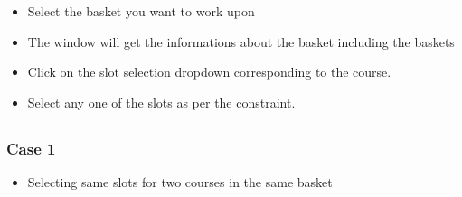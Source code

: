 \documentclass[letterpaper,10pt,english]{sphinxmanual}
\begin{document}
\begin{itemize}
\item {} 
Select the basket you want to work upon

\end{itemize}

\begin{itemize}
\item {} 
The window will get the informations about the basket including the baskets

\end{itemize}

\begin{itemize}
\item {} 
Click on the slot selection dropdown corresponding to the course.

\end{itemize}

\begin{itemize}
\item {} 
Select any one of the slots as per the constraint.

\end{itemize}



\subsection{}
\label{\detokenize{user_manual:id3}}

\subsubsection{Case 1}
\label{\detokenize{user_manual:id4}}\begin{itemize}
\item {} 
Selecting same slots for two courses in the same basket

\end{itemize}
\end{document}
